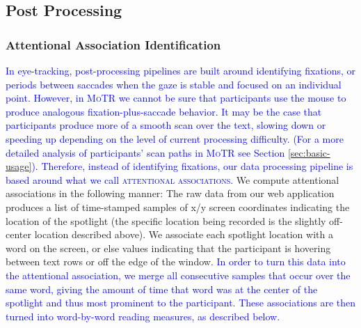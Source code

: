 \documentclass[12pt]{article}
\newcommand{\motr}{\textsc{MoTR}\xspace}
\newcommand{\defn}[1]{\textsc{#1}}
\newcommand{\change}[1]{\textcolor{blue}{#1}}
\begin{document}
\subsection{Post Processing}

\subsubsection{Attentional Association Identification}

\change{In eye-tracking, post-processing pipelines are built around identifying fixations, or periods between saccades when the gaze is stable and focused on an individual point. However, in \motr we cannot be sure that participants use the mouse to produce analogous fixation-plus-saccade behavior. It may be the case that participants produce more of a smooth scan over the text, slowing down or speeding up depending on the level of current processing difficulty. (For a more detailed analysis of participants' scan paths in \motr see Section \ref{sec:basic-usage}). Therefore, instead of identifying fixations, our data processing pipeline is based around what we call \defn{attentional associations}.} We compute attentional associations in the following manner: The raw data from our web application produces a list of time-stamped samples of x/y screen coordinates indicating the location of the spotlight (the specific location being recorded is the slightly off-center location described above). We associate each spotlight location with a word on the screen, or else values indicating that the participant is hovering between text rows or off the edge of the window. \change{In order to turn this data into the attentional association, we merge all consecutive samples that occur over the same word, giving the amount of time that word was at the center of the spotlight and thus most prominent to the participant. These associations are then turned into word-by-word reading measures, as described below.}
\end{document}
